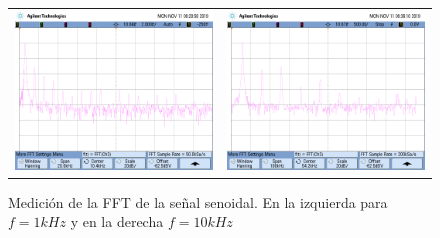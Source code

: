 \begin{figure}[H]
    \centering
    \begin{tabular}{c c}
        \includegraphics[scale=0.2]{../EJ3/Mediciones/Actuales/Osciloscopio/Distorsion_1k/scope_2.png} &
        \includegraphics[scale=0.2]{../EJ3/Mediciones/Actuales/Osciloscopio/Distorsion_10k/scope_11.png}
    \end{tabular}
    \caption{Medici\'on de la FFT de la se\~nal senoidal. En la izquierda para $f = 1kHz$ y en la derecha $f = 10kHz$}
\end{figure}

